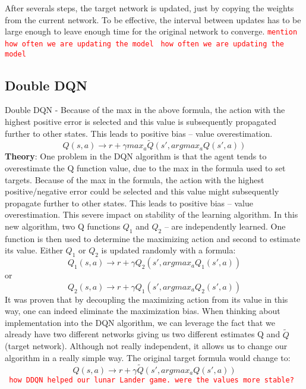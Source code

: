 After severals steps, the target network is updated, just by copying the weights from the current network. To be effective, the interval between updates has to be large enough to leave enough time for the original network to converge.
 \textcolor{red}{\texttt{mention how often we are updating the model}}
\newline
 \textcolor{red}{\texttt{ how often we are updating the model}}

\subsection{Double DQN}
Double DQN - Because of the max in the above formula, the action with the highest positive error is selected and this value is subsequently propagated further to other states. This leads to positive bias – value overestimation.
\begin{equation}
Q(s,a) \rightarrow r + \gamma max_{a} \tilde{Q}(s', argmax_{a}Q(s', a))
\end{equation}
\textbf{Theory}: One problem in the DQN algorithm is that the agent tends to overestimate the Q function value, due to the max in the formula used to set targets.
Because of the max in the formula, the action with the highest positive/negative error could be selected and this value might subsequently propagate further to other states. This leads to positive bias – value overestimation. This severe impact on stability of the learning algorithm.
\newline
In this new algorithm, two Q functions $Q_{1}$ and $Q_2$ – are independently learned. One function is then used to determine the maximizing action and second to estimate its value. Either $Q_1$ or $Q_2$ is updated randomly with a formula:
\begin{equation}
Q_1(s, a) \xrightarrow{} r + \gamma Q_2(s', argmax_a Q_1(s', a)) 
\end{equation}
or
\begin{equation}
Q_2(s, a) \xrightarrow{} r + \gamma Q_1(s', argmax_a Q_2(s', a)) 
\end{equation}
It was proven that by decoupling the maximizing action from its value in this way, one can indeed eliminate the maximization bias.
\newline
When thinking about implementation into the DQN algorithm, we can leverage the fact that we already have two different networks giving us two different estimates Q and $\tilde{Q}$ (target network). Although not really independent, it allows us to change our algorithm in a really simple way.
\newline
The original target formula would change to:
\begin{equation}
Q(s, a) \xrightarrow{} r + \gamma \tilde{Q}(s', argmax_a Q(s', a))
\end{equation}
 \textcolor{red}{\texttt{ how DDQN helped our lunar Lander game. were the values more stable?}}
 
